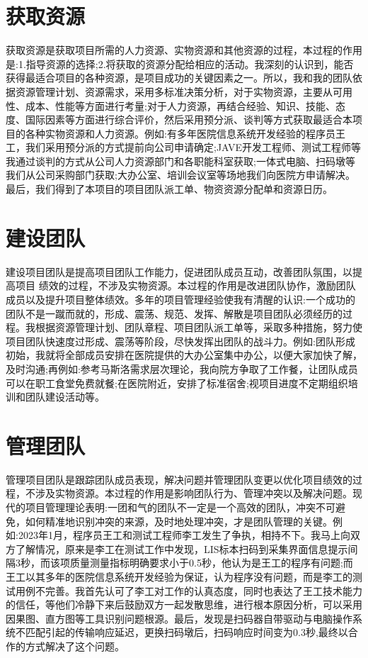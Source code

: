 \documentclass[UTF8]{../computerUniverse}
\begin{document}
\section{获取资源}

获取资源是获取项目所需的人力资源、实物资源和其他资源的过程，本过程的作用是:1.指导资源的选择;2.将获取的资源分配给相应的活动。我深刻的认识到，能否获得最适合项目的各种资源，是项目成功的关键因素之一。所以，我和我的团队依据资源管理计划、资源需求，采用多标准决策分析，对于实物资源，主要从可用性、成本、性能等方面进行考量;对于人力资源，再结合经验、知识、技能、态度、国际因素等方面进行综合评价，然后采用预分派、谈判等方式获取最适合本项目的各种实物资源和人力资源。例如:有多年医院信息系统开发经验的程序员王工，我们采用预分派的方式提前向公司申请确定;JAVE开发工程师、测试工程师等我通过谈判的方式从公司人力资源部门和各职能科室获取;一体式电脑、扫码墩等我们从公司采购部门获取;大办公室、培训会议室等场地我们向医院方申请解决。最后，我们得到了本项目的项目团队派工单、物资资源分配单和资源日历。


\section{建设团队}

建设项目团队是提高项目团队工作能力，促进团队成员互动，改善团队氛围，以提高项目
绩效的过程，不涉及实物资源。本过程的作用是改进团队协作，激励团队成员以及提升项目整体绩效。多年的项目管理经验使我有清醒的认识:一个成功的团队不是一蹴而就的，形成、震荡、规范、发挥、解散是项目团队必须经历的过程。我根据资源管理计划、团队章程、项目团队派工单等，采取多种措施，努力使项目团队快速度过形成、震荡等阶段，尽快发挥出团队的战斗力。例如:团队形成初始，我就将全部成员安排在医院提供的大办公室集中办公，以便大家加快了解，及时沟通;再例如:参考马斯洛需求层次理论，我向院方争取了工作餐，让团队成员可以在职工食堂免费就餐;在医院附近，安排了标准宿舍;视项目进度不定期组织培训和团队建设活动等。


\section{管理团队}

管理项目团队是跟踪团队成员表现，解决问题并管理团队变更以优化项目绩效的过程，不涉及实物资源。本过程的作用是影响团队行为、管理冲突以及解决问题。现代的项目管理理论表明:一团和气的团队不一定是一个高效的团队，冲突不可避免，如何精准地识别冲突的来源，及时地处理冲突，才是团队管理的关键。例如:2023年1月，程序员王工和测试工程师李工发生了争执，相持不下。我马上向双方了解情况，原来是李工在测试工作中发现，LIS标本扫码到采集界面信息提示间隔3秒，而该项质量测量指标明确要求小于0.5秒，他认为是王工的程序有问题;而王工以其多年的医院信息系统开发经验为保证，认为程序没有问题，而是李工的测试用例不完善。我首先认可了李工对工作的认真态度，同时也表达了王工技术能力的信任，等他们冷静下来后鼓励双方一起发散思维，进行根本原因分析，可以采用因果图、直方图等工具识别问题根源。最后，发现是扫码器自带驱动与电脑操作系统不匹配引起的传输响应延迟，更换扫码墩后，扫码响应时间变为0.3秒,最终以合作的方式解决了这个问题。
\end{document}
